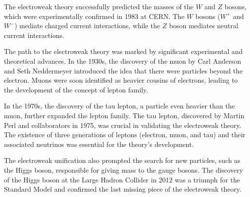 The electroweak theory successfully predicted the masses of the $W$ and $Z$ bosons, which were experimentally confirmed in 1983 at CERN.
The $W$ bosons ($W^+$ and $W^-$) mediate charged current interactions, while the $Z$ boson mediates neutral current interactions.

The path to the electroweak theory was marked by significant experimental and theoretical advances.
In the 1930s, the discovery of the muon by Carl Anderson and Seth Neddermeyer introduced the idea that there were particles beyond the electron.
Muons were soon identified as heavier cousins of electrons, leading to the development of the concept of lepton family.

In the 1970s, the discovery of the tau lepton, a particle even heavier than the muon, further expanded the lepton family.
The tau lepton, discovered by Martin Perl and collaborators in 1975, was crucial in validating the electroweak theory.
The existence of three generations of leptons (electron, muon, and tau) and their associated neutrinos was essential for the theory's development.

The electroweak unification also prompted the search for new particles, such as the Higgs boson, responsible for giving mass to the gauge bosons.
The discovery of the Higgs boson at the Large Hadron Collider in 2012 was a triumph for the Standard Model and confirmed the last missing piece of the electroweak theory.



